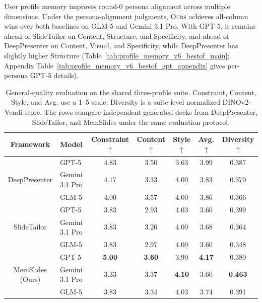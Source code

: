 \documentclass{llmxive}
\providecommand{\methodname}{MemSlides\xspace}
\providecommand{\arraystretch}{1.0}
\begin{document}
User profile memory improves round-0 persona alignment across multiple
dimensions. Under the persona-alignment judgments, \textsc{Ours} achieves
all-column wins over both baselines on GLM-5 and Gemini 3.1 Pro. With GPT-5, it
remains ahead of SlideTailor on Content, Structure, and Specificity, and ahead
of DeepPresenter on Content, Visual, and Specificity, while DeepPresenter has
slightly higher Structure (Table~\ref{tab:profile_memory_v6_bestof_main};
Appendix Table~\ref{tab:profile_memory_v6_bestof_gpt_appendix} gives
per-persona GPT-5 details).

\begin{table}[t]
\centering
\small
\setlength{\tabcolsep}{5.2pt}
\renewcommand{\arraystretch}{1.0}
\begin{tabular*}{\textwidth}{@{\extracolsep{\fill}}clccccc@{}}
\toprule
Framework & Model & Constraint $\uparrow$ & Content $\uparrow$ & Style $\uparrow$ & Avg. $\uparrow$ & Diversity $\uparrow$ \\
\midrule
\multirow{3}{*}{\centering DeepPresenter}
& GPT-5 & 4.83 & 3.50 & 3.63 & 3.99 & 0.387 \\
& Gemini 3.1 Pro & 4.17 & 3.33 & 4.00 & 3.83 & 0.370 \\
& GLM-5 & 4.00 & 3.57 & 4.00 & 3.86 & 0.366 \\
\midrule
\multirow{3}{*}{\centering SlideTailor}
& GPT-5 & 3.83 & 2.93 & 4.03 & 3.60 & 0.399 \\
& Gemini 3.1 Pro & 3.83 & 3.20 & 4.00 & 3.68 & 0.364 \\
& GLM-5 & 3.83 & 2.97 & 4.00 & 3.60 & 0.348 \\
\midrule
\multirow{3}{*}{\centering MemSlides ({Ours})}
& GPT-5 & \textbf{5.00} & \textbf{3.60} & 3.90 & \textbf{4.17} & 0.380 \\
& Gemini 3.1 Pro & 3.33 & 3.37 & \textbf{4.10} & 3.60 & \textbf{0.463} \\
& GLM-5 & 3.83 & 3.34 & 4.03 & 3.74 & 0.391 \\
\bottomrule
\end{tabular*}
\caption{General-quality evaluation on the
shared three-profile suite.  Constraint, Content, Style, and Avg. use a 1--5 scale;
Diversity is a suite-level normalized DINOv2-Vendi score. The rows compare
independent generated decks from DeepPresenter, SlideTailor, and \methodname
under the same evaluation protocol.}
\label{tab:profile_memory_v6_ppteval_main}
\end{table}
\end{document}
